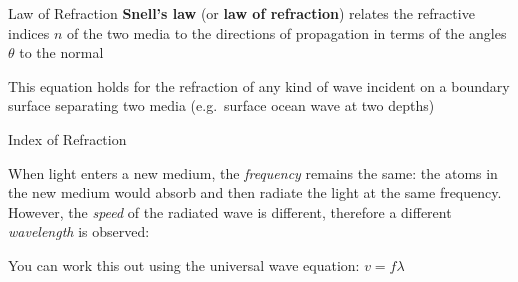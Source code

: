 \documentclass[12pt,compress,aspectratio=169]{beamer}
\newcommand{\pic}[2]{\texttt{[image: \#2]}}
\newcommand{\eq}[2]{\vspace{#1}{\LARGE\begin{displaymath}#2\end{displaymath}}}
\begin{document}
\begin{frame}{Law of Refraction}
  \textbf{Snell's law} (or \textbf{law of refraction}) relates the refractive
  indices $n$ of the two media to the directions of propagation in terms of the
  angles $\theta$ to the normal

  \eq{-.2in}{
    \boxed{n_1\sin\theta_1=n_2\sin\theta_2}
  }

  This equation holds for the refraction of any kind of wave incident on a
  boundary surface separating two media (e.g.\ surface ocean wave at two
  depths)
\end{frame}



%    



\begin{frame}{Index of Refraction}
%

  When light enters a new medium, the \emph{frequency} remains the same: the
  atoms in the new medium would absorb and then radiate the light at the same
  frequency. However, the \emph{speed} of the radiated wave is different,
  therefore a different \emph{wavelength} is observed:
    
  \eq{-.2in}{
    \boxed{\frac{n_1}{n_2}=\frac{\lambda_2}{\lambda_1}}
  }

  You can work this out using the universal wave equation: $v=f\lambda$
\end{frame}
\end{document}
